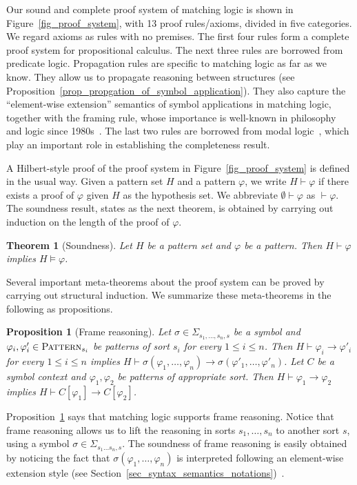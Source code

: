 \documentclass[letter,12pt]{article}
\newtheorem{theorem}{Theorem}
\newtheorem{proposition}{Proposition}
\newcommand{\imp}{\to}
\newcommand{\Pattern}{\textnormal{\textsc{Pattern}}}
\newcommand{\ddd}{,\dots,}
\newcommand{\SigmaSub}[1]{\Sigma_{#1}}
\begin{document}
Our sound and complete proof system of matching logic
is shown in Figure~\ref{fig_proof_system},
with 13 proof rules/axioms, divided in five categories.
We regard axioms as rules with no premises.
The first four rules form a complete proof system for propositional calculus.
The next three rules are borrowed from predicate logic.
Propagation rules are specific to matching logic as far as we know.
They allow us to propagate reasoning between structures 
(see Proposition~\ref{prop_propgation_of_symbol_application}).
They also capture
the ``element-wise extension'' semantics of symbol applications
in matching logic,
together with the framing rule,
whose importance is well-known in philosophy and logic since 1980s~\cite{bibid}.
The last two rules are borrowed from modal logic~\cite{bibid},
which play an important role in establishing the completeness result.

A Hilbert-style proof of the proof system in Figure~\ref{fig_proof_system}
is defined in the usual way.
Given a pattern set $H$ and a pattern $\varphi$,
we write $H \vdash \varphi$ if
there exists a proof of $\varphi$ 
given $H$ as the hypothesis set.
We abbreviate $\emptyset \vdash \varphi$ as $\vdash \varphi$.
The soundness result,
states as the next theorem,
is obtained by carrying out induction on the length of the proof of $\varphi$.
\begin{theorem}[Soundness]
Let $H$ be a pattern set and $\varphi$ be a pattern.
Then $H \vdash \varphi$ implies $H \vDash \varphi$.
\end{theorem}

Several important meta-theorems about the proof system
can be proved by carrying out structural induction.
We summarize these meta-theorems in the following as propositions.

\begin{proposition}[Frame reasoning]
\label{prop_framing}
Let $\sigma \in \SigmaSub{s_1 \ddd s_n , s}$ be a symbol
and $\varphi_i, \varphi'_i \in \Pattern_{s_i}$ be patterns
of sort $s_i$ for every $1 \le i \le n$.
Then $H \vdash \varphi_i \imp \varphi'_i$ for every $1 \le i \le n$
implies $H \vdash 
\sigma(\varphi_1 \ddd \varphi_n) \imp
\sigma(\varphi'_1 \ddd \varphi'_n)$.
Let $C$ be a symbol context and $\varphi_1,\varphi_2$ be patterns of appropriate sort.
Then $H \vdash \varphi_1 \imp \varphi_2$
implies $H \vdash C[\varphi_1] \imp C[\varphi_2]$.
\end{proposition}
Proposition~\ref{prop_framing} says that matching logic
supports frame reasoning.
Notice that frame reasoning allows us to lift 
the reasoning in sorts $s_1 \ddd s_n$
to another sort $s$, using a symbol $\sigma \in \Sigma_{s_1 \dots s_n,s}$.
The soundness of frame reasoning is easily obtained
by noticing the fact that $\sigma(\varphi_1 \ddd \varphi_n)$ is interpreted
following an element-wise extension style
(see Section~\ref{sec_syntax_semantics_notations})~\cite{bibid}.
\end{document}
